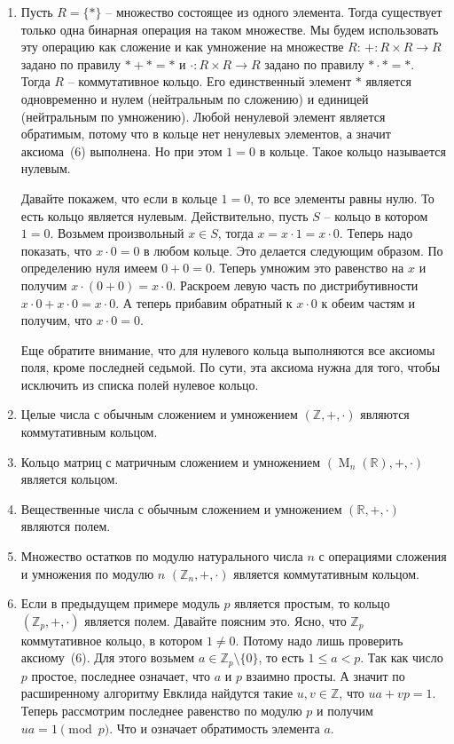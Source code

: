 \begin{examples}
\begin{enumerate}
\item Пусть $R = \{*\}$ -- множество состоящее из одного элемента.
Тогда существует только одна бинарная операция на таком множестве.
Мы будем использовать эту операцию как сложение и как умножение на множестве $R$: $+\colon R\times R\to R$ задано по правилу $* + * = *$ и $\cdot \colon R\times R\to R$ задано по правилу $* \cdot * = *$.
Тогда $R$ -- коммутативное кольцо.
Его единственный элемент $*$ является одновременно и нулем (нейтральным по сложению) и единицей (нейтральным по умножению).
Любой ненулевой элемент является обратимым, потому что в кольце нет ненулевых элементов, а значит аксиома~(6) выполнена.
Но при этом $1 = 0$ в кольце.
Такое кольцо называется нулевым.

Давайте покажем, что если в кольце $1 = 0$, то все элементы равны нулю.
То есть кольцо является нулевым.
Действительно, пусть $S$ -- кольцо в котором $1 = 0$.
Возьмем произвольный $x\in S$, тогда $x = x \cdot 1 = x \cdot 0$.
Теперь надо показать, что $x \cdot 0 = 0$ в любом кольце.
Это делается следующим образом.
По определению нуля имеем $0 + 0 = 0$.
Теперь умножим это равенство на $x$ и получим $x\cdot (0 + 0) = x \cdot 0$.
Раскроем левую часть по дистрибутивности $x \cdot 0 + x\cdot 0 = x\cdot 0$.
А теперь прибавим обратный к $x \cdot 0$ к обеим частям и получим, что $ x\cdot 0 = 0$.

Еще обратите внимание, что для нулевого кольца выполняются все аксиомы поля, кроме последней седьмой.
По сути, эта аксиома нужна для того, чтобы исключить из списка полей нулевое кольцо.

\item Целые числа с обычным сложением и умножением $(\mathbb Z, +, \cdot)$ являются коммутативным кольцом.

\item Кольцо матриц с матричным сложением и умножением $(\operatorname{M}_n(\mathbb R), +, \cdot)$ является кольцом.

\item Вещественные числа с обычным сложением и умножением $(\mathbb R, +, \cdot)$ являются полем.

\item Множество остатков по модулю натурального числа $n$ с операциями сложения и умножения по модулю $n$ $(\mathbb Z_n, +, \cdot)$ является коммутативным кольцом.

\item Если в предыдущем примере модуль $p$ является простым, то кольцо $(\mathbb Z_p, +,\cdot)$ является полем.
Давайте поясним это.
Ясно, что $\mathbb Z_p$ коммутативное кольцо, в котором $1 \neq 0$.
Потому надо лишь проверить аксиому~(6).
Для этого возьмем $a\in \mathbb Z_p\setminus\{0\}$, то есть $1 \leqslant a < p$.
Так как число $p$ простое, последнее означает, что $a$ и $p$ взаимно просты.
А значит по расширенному алгоритму Евклида найдутся такие $u, v\in \mathbb Z$, что $u a + v p = 1$.
Теперь рассмотрим последнее равенство по модулю $p$ и получим $u a = 1 \pmod p$.
Что и означает обратимость элемента $a$.


\end{enumerate}
\end{examples}

